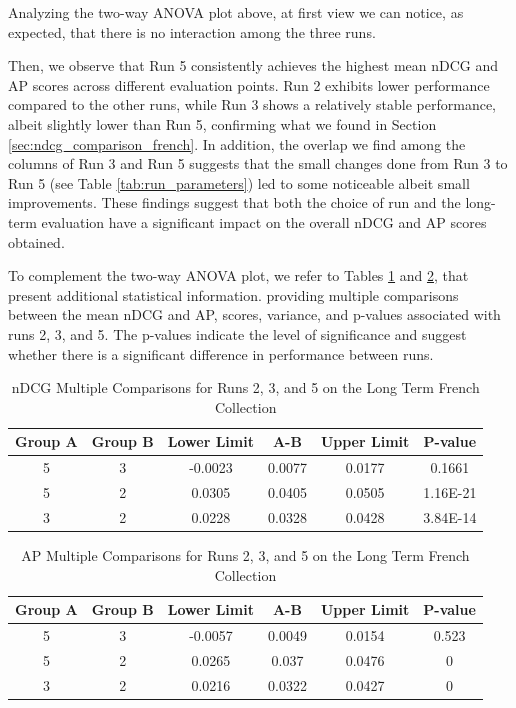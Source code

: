 Analyzing the two-way \ac{ANOVA} plot above, at first view we can notice, as expected, that there is no interaction among the three runs.  

Then, we observe that Run 5 consistently achieves the highest mean \ac{nDCG}  and \ac{AP} scores across different evaluation points. 
Run 2 exhibits lower performance compared to the other runs, while Run 3 shows a relatively stable performance, albeit slightly lower than Run 5, confirming what we found in Section \ref{sec:ndcg_comparison_french}.
In addition, the overlap we find among the columns of Run 3 and Run 5 suggests that the small changes done from Run 3 to Run 5 (see Table \ref{tab:run_parameters}) led to some noticeable albeit small improvements. 
These findings suggest that both the choice of run and the long-term evaluation have a significant impact on the overall \ac{nDCG} and \ac{AP} scores obtained.

To complement the two-way \ac{ANOVA} plot, we refer to Tables \ref{table:lt_anova_french} and \ref{table:lt_anova_french_ap}, that present additional statistical information.
providing multiple comparisons between the mean \ac{nDCG} and \ac{AP}, scores, variance, and p-values associated with runs 2, 3, and 5. 
The p-values indicate the level of significance and suggest whether there is a significant difference in performance between runs. 

\begin{table}[!h]
    \centering
    \caption{\ac{nDCG} Multiple Comparisons for Runs 2, 3, and 5 on the Long Term French Collection}
    \label{table:lt_anova_french}
    \begin{tabular}{cccccc}
    \hline
    Group A & Group B & Lower Limit & A-B & Upper Limit & P-value \\ \hline
    5 & 3 & -0.0023 & 0.0077 & 0.0177 & 0.1661 \\
    5 & 2 & 0.0305 & 0.0405 & 0.0505 & 1.16E-21 \\
    3 & 2 & 0.0228 & 0.0328 & 0.0428 & 3.84E-14 \\ \hline
    \end{tabular}
\end{table}

\begin{table}[!h]
    \centering
    \caption{\ac{AP} Multiple Comparisons for Runs 2, 3, and 5 on the Long Term French Collection}
    \label{table:lt_anova_french_ap}
    \begin{tabular}{cccccc}
    \hline
    Group A & Group B & Lower Limit & A-B & Upper Limit & P-value \\ \hline
    5 & 3 & -0.0057 & 0.0049 & 0.0154 & 0.523 \\
    5 & 2 & 0.0265 & 0.037 & 0.0476 & 0 \\
    3 & 2 & 0.0216 & 0.0322 & 0.0427 & 0 \\ \hline
    \end{tabular}
\end{table}

